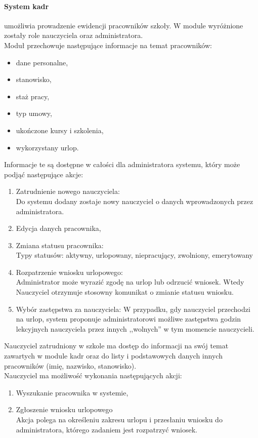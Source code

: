 \documentclass{article}
\begin{document}
\paragraph{System kadr} umożliwia prowadzenie ewidencji pracowników szkoły. W module wyróżnione zostały role nauczyciela oraz administratora.\\ Moduł przechowuje następujące informacje na temat pracowników:
\begin{itemize}
\item dane personalne,
\item stanowisko,
\item staż pracy,
\item typ umowy,
\item ukończone kursy i szkolenia,
\item wykorzystany urlop.
\end{itemize}
Informacje te są dostępne w całości dla administratora systemu, który może podjąć następujące akcje:
\begin{enumerate}
\item Zatrudnienie nowego nauczyciela:\\
Do systemu dodany zostaje nowy nauczyciel o danych wprowadzonych przez administratora.
\item Edycja danych pracownika,
\item Zmiana statusu pracownika:\\
Typy statusów: aktywny, urlopowany, niepracujący, zwolniony, emerytowany
\item Rozpatrzenie wniosku urlopowego:\\
Administrator może wyrazić zgodę na urlop lub odrzucić wniosek. Wtedy Nauczyciel otrzymuje stosowny komunikat o zmianie statusu wniosku.
\item Wybór zastępstwa za nauczyciela:
W przypadku, gdy nauczyciel przechodzi na urlop, system proponuje administratorowi możliwe zastępstwa godzin lekcyjnych nauczyciela przez innych ,,wolnych'' w tym momencie nauczycieli.
\end{enumerate}

Nauczyciel zatrudniony w szkole ma dostęp do informacji na swój temat zawartych w module kadr oraz do listy i podstawowych danych innych pracowników (imię, nazwisko, stanowisko).\\
Nauczyciel ma możliwość wykonania następujących akcji:
\begin{enumerate}
\item Wyszukanie pracownika w systemie,
\item Zgłoszenie wniosku urlopowego\\
Akcja polega na określeniu zakresu urlopu i przesłaniu wniosku do administratora, którego zadaniem jest rozpatrzyć wniosek.
\end{enumerate}
\end{document}
